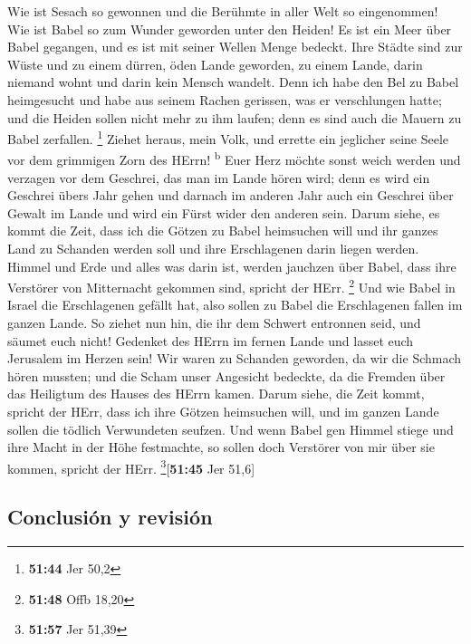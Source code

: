  Wie ist Sesach so gewonnen und die Berühmte in aller
Welt so eingenommen! Wie ist Babel so zum Wunder geworden unter den
Heiden!  Es ist ein Meer über Babel gegangen, und es ist
mit seiner Wellen Menge bedeckt.  Ihre Städte sind zur
Wüste und zu einem dürren, öden Lande geworden, zu einem Lande, darin
niemand wohnt und darin kein Mensch wandelt.  Denn ich
habe den Bel zu Babel heimgesucht und habe aus seinem Rachen gerissen,
was er verschlungen hatte; und die Heiden sollen nicht mehr zu ihm
laufen; denn es sind auch die Mauern zu Babel zerfallen. \footnote{\textbf{51:44}
  Jer 50,2}  Ziehet heraus, mein Volk, und errette ein
jeglicher seine Seele vor dem grimmigen Zorn des HErrn!
\textsuperscript{b}  Euer Herz möchte sonst weich werden
und verzagen vor dem Geschrei, das man im Lande hören wird; denn es wird
ein Geschrei übers Jahr gehen und darnach im anderen Jahr auch ein
Geschrei über Gewalt im Lande und wird ein Fürst wider den anderen sein.
 Darum siehe, es kommt die Zeit, dass ich die Götzen zu
Babel heimsuchen will und ihr ganzes Land zu Schanden werden soll und
ihre Erschlagenen darin liegen werden.  Himmel und Erde
und alles was darin ist, werden jauchzen über Babel, dass ihre Verstörer
von Mitternacht gekommen sind, spricht der HErr. \footnote{\textbf{51:48}
  Offb 18,20}  Und wie Babel in Israel die Erschlagenen
gefällt hat, also sollen zu Babel die Erschlagenen fallen im ganzen
Lande.  So ziehet nun hin, die ihr dem Schwert entronnen
seid, und säumet euch nicht! Gedenket des HErrn im fernen Lande und
lasset euch Jerusalem im Herzen sein!  Wir waren zu
Schanden geworden, da wir die Schmach hören mussten; und die Scham unser
Angesicht bedeckte, da die Fremden über das Heiligtum des Hauses des
HErrn kamen.  Darum siehe, die Zeit kommt, spricht der
HErr, dass ich ihre Götzen heimsuchen will, und im ganzen Lande sollen
die tödlich Verwundeten seufzen.  Und wenn Babel gen
Himmel stiege und ihre Macht in der Höhe festmachte, so sollen doch
Verstörer von mir über sie kommen, spricht der HErr.
\footnote{\textbf{51:57} Jer 51,39}{[}\textbf{51:45} Jer 51,6{]}

\hypertarget{conclusiuxf3n-y-revisiuxf3n}{%
\subsection{Conclusión y revisión}\label{conclusiuxf3n-y-revisiuxf3n}}

